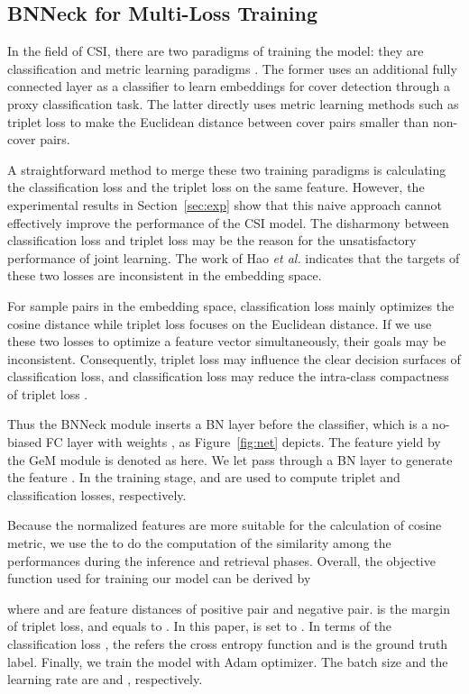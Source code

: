 \documentclass{article}
\newcommand{\figref}[1]{\mbox{Figure~\ref{#1}}}
\newcommand{\secref}[1]{\mbox{Section~\ref{#1}}}
\newcommand{\etal}{\textit{et al.}}
\begin{document}
\subsection{BNNeck for Multi-Loss Training}

In the field of CSI, there are two paradigms of training the model: they are classification and metric learning paradigms \cite{doras2020combining}. The former \cite{yu2020learning} uses an additional fully connected layer as a classifier to learn embeddings for cover detection through a proxy classification task. The latter \cite{yesiler2020accurate} directly uses metric learning methods such as triplet loss to make the Euclidean distance between cover pairs smaller than non-cover pairs.  

A straightforward method to merge these two training paradigms is calculating the classification loss and the triplet loss on the same feature.
However, the experimental results in \secref{sec:exp} show that this naive approach cannot effectively improve the performance of the CSI model.
The disharmony between classification loss and triplet loss may be the reason for the unsatisfactory performance of joint learning. The work of Hao \etal \cite {luo2019bag} indicates that the targets of these two losses are inconsistent in the embedding space. 

For sample pairs in the embedding space, classification loss mainly optimizes the cosine distance while triplet loss focuses on the Euclidean distance. If we use these two losses to optimize a feature vector simultaneously, their goals may be inconsistent. Consequently, triplet loss may influence the clear decision surfaces of classification loss, and classification loss may reduce the intra-class compactness of triplet loss \cite {luo2019bag}. 

Thus the BNNeck module inserts a BN layer before the classifier,  which is a no-biased FC layer with weights , as \figref{fig:net} depicts. The feature yield by the GeM module is denoted as  here. We let  pass through a BN layer to generate the feature . In the training stage,  and  are used to compute triplet and classification losses, respectively.  

Because the normalized features are more suitable for the calculation of cosine metric, we use the  to do the computation of the similarity among the performances during the inference and retrieval phases. Overall, the objective function used for training our model can be derived by

where  and  are feature distances of positive pair and negative pair.
 is the margin of triplet loss, and  equals to .
In this paper,  is set to . In terms of the classification loss , the  refers the cross entropy function and  is the ground truth label. Finally, we train the model with Adam optimizer. The batch size and the learning rate are  and , respectively.
%
\end{document}

